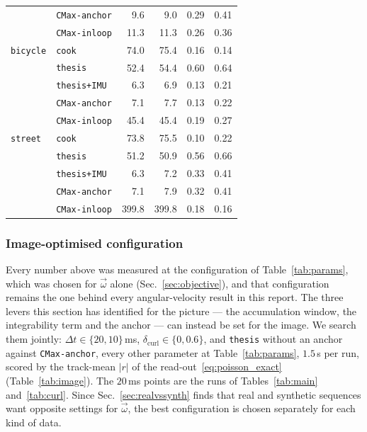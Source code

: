 \documentclass[journal]{IEEEtran}
\newcommand{\wvec}{\vec{\omega}}
\begin{document}
\begin{table}[!t]
\begin{tabular}{@{}llrrrr@{}}
                      & \texttt{CMax-anchor}  & 9.6 & 9.0 & 0.29 & 0.41 \\
                      & \texttt{CMax-inloop}  & 11.3 & 11.3 & 0.26 & 0.36 \\
\midrule
\texttt{bicycle}      & \texttt{cook}         & 74.0 & 75.4 & 0.16 & 0.14 \\
                      & \texttt{thesis}       & 52.4 & 54.4 & 0.60 & 0.64 \\
                      & \texttt{thesis+IMU}   & 6.3 & 6.9 & 0.13 & 0.21 \\
                      & \texttt{CMax-anchor}  & 7.1 & 7.7 & 0.13 & 0.22 \\
                      & \texttt{CMax-inloop}  & 45.4 & 45.4 & 0.19 & 0.27 \\
\midrule
\texttt{street}       & \texttt{cook}         & 73.8 & 75.5 & 0.10 & 0.22 \\
                      & \texttt{thesis}       & 51.2 & 50.9 & 0.56 & 0.66 \\
                      & \texttt{thesis+IMU}   & 6.3 & 7.2 & 0.33 & 0.41 \\
                      & \texttt{CMax-anchor}  & 7.1 & 7.9 & 0.32 & 0.41 \\
                      & \texttt{CMax-inloop}  & 399.8 & 399.8 & 0.18 & 0.16 \\
\bottomrule
\end{tabular}
\end{table}

\subsubsection{Image-optimised configuration}
\label{sec:image_settings}
Every number above was measured at the configuration of
Table~\ref{tab:params}, which was chosen for $\wvec$ alone
(Sec.~\ref{sec:objective}), and that configuration remains the one behind every
angular-velocity result in this report. The three levers this section has
identified for the picture --- the accumulation window, the integrability term
and the anchor --- can instead be set for the image. We search them jointly:
$\Delta t \in \{20, 10\}$\,ms, $\delta_{\text{curl}} \in \{0, 0.6\}$, and
\texttt{thesis} without an anchor against \texttt{CMax-anchor}, every other
parameter at Table~\ref{tab:params}, $1.5$\,s per run, scored by the
track-mean $|r|$ of the read-out~\eqref{eq:poisson_exact}
(Table~\ref{tab:image}). The $20$\,ms points are the runs of
Tables~\ref{tab:main} and~\ref{tab:curl}. Since Sec.~\ref{sec:realvssynth}
finds that real and synthetic sequences want opposite settings for $\wvec$, the
best configuration is chosen separately for each kind of data.
\end{document}
